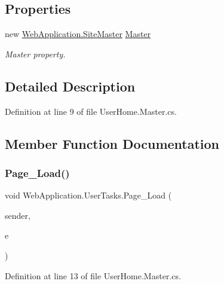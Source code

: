 \subsection*{Properties}
\begin{DoxyCompactItemize}
\item 
new \mbox{\hyperlink{classWebApplication_1_1SiteMaster}{Web\+Application.\+Site\+Master}} \mbox{\hyperlink{classWebApplication_1_1UserTasks_a164d46c79400b72316927ce0f84f6db8}{Master}}
\begin{DoxyCompactList}\small\item\em Master property. \end{DoxyCompactList}\end{DoxyCompactItemize}


\subsection{Detailed Description}


Definition at line 9 of file User\+Home.\+Master.\+cs.



\subsection{Member Function Documentation}
\mbox{\label{classWebApplication_1_1UserTasks_a741bea9ced0083590cfa88d43b5441df}} 
\subsubsection{\texorpdfstring{Page\_Load()}{Page\_Load()}}
{\footnotesize\ttfamily void Web\+Application.\+User\+Tasks.\+Page\+\_\+\+Load (\begin{DoxyParamCaption}\item[{object}]{sender,  }\item[{Event\+Args}]{e }\end{DoxyParamCaption})\hspace{0.3cm}{\ttfamily [protected]}}



Definition at line 13 of file User\+Home.\+Master.\+cs.




